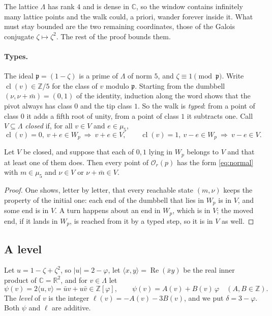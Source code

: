 \documentclass[11pt,a4paper]{article}
\newcommand{\C}{\mathbb{C}}
\newcommand{\R}{\mathbb{R}}
\newcommand{\Z}{\mathbb{Z}}
\newcommand{\Lam}{\Lambda}
\newcommand{\Or}{\mathcal{O}}
\newcommand{\cls}{\operatorname{cl}}
\newcommand{\Win}{W}
\newcommand{\bm}{\bar m}
\newcommand{\re}{\operatorname{Re}}
\begin{document}
The lattice $\Lam$ has rank $4$ and is dense in $\C$, so the window contains infinitely many lattice
points and the walk could, a priori, wander forever inside it. What must stay bounded are the two
remaining coordinates, those of the Galois conjugate $\zeta\mapsto\zeta^2$. The rest of the proof
bounds them.

\paragraph{Types.}
The ideal $\mathfrak p=(1-\zeta)$ is a prime of $\Lam$ of norm $5$, and $\zeta\equiv1\pmod{\mathfrak p}$.
Write $\cls(v)\in\Z/5$ for the class of $v$ modulo $\mathfrak p$. Starting from the dumbbell
$(\nu,\nu+\bm)=(0,1)$ of the identity, induction along the word shows that the pivot always has
class $0$ and the tip class $1$. So the walk is \emph{typed}: from a point of class $0$ it adds a
fifth root of unity, from a point of class $1$ it subtracts one. Call $V\subseteq\Lam$
\emph{closed} if, for all $v\in V$ and $e\in\mu_5$,
\[
  \cls(v)=0,\ v+e\in\Win_p\ \Longrightarrow\ v+e\in V,\qquad
  \cls(v)=1,\ v-e\in\Win_p\ \Longrightarrow\ v-e\in V.
\]

\begin{lemma}\label{lem:invariant}
Let $V$ be closed, and suppose that each of $0,1$ lying in $\Win_p$ belongs to $V$ and that at
least one of them does. Then every point of $\Or_r(p)$ has the form \eqref{eq:normal} with
$m\in\mu_5$ and $\nu\in V$ or $\nu+\bm\in V$.
\end{lemma}

\begin{proof}
One shows, letter by letter, that every reachable state $(m,\nu)$ keeps the property of the initial
one: each end of the dumbbell that lies in $\Win_p$ is in $V$, and some end is in $V$. A turn happens
about an end in $\Win_p$, which is in $V$; the moved end, if it lands in $\Win_p$, is reached from it
by a typed step, so it is in $V$ as well.
\end{proof}

\subsection{A level}

Let $u=1-\zeta+\zeta^2$, so $|u|=2-\varphi$, let $\langle x,y\rangle=\re(\bar xy)$ be the real inner
product of $\C=\R^2$, and for $v\in\Lam$ let
\[
  \psi(v)=2\langle u,v\rangle=\bar uv+u\bar v\in\Z[\varphi],\qquad \psi(v)=A(v)+B(v)\,\varphi\quad(A,B\in\Z).
\]
The \emph{level} of $v$ is the integer $\ell(v)=-A(v)-3B(v)$, and we put $\delta=3-\varphi$. Both
$\psi$ and $\ell$ are additive.
\end{document}
